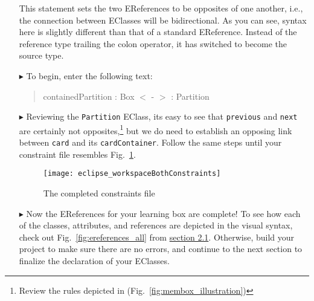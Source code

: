 \begin{itemize}
This statement sets the two EReferences to be opposites of one another, i.e., the connection between EClasses will be bidirectional. As you can see, syntax here
is slightly different than that of a standard EReference. Instead of the reference type trailing the colon operator, it has switched to become the source type.


\item[$\blacktriangleright$] To begin, enter the following text:

{\begin{quote} \small
	containedPartition : Box $<$ - $>$ : Partition
\end{quote}}

\item[$\blacktriangleright$] Reviewing the \texttt{Partition} EClass, its easy to see that \texttt{previous} and \texttt{next} are certainly not
opposites,\footnote{Review the rules depicted in (Fig.~\ref{fig:membox_illustration})} but we do need to establish an opposing link between
\texttt{card} and its \texttt{cardContainer}. Follow the same steps until your constraint file resembles Fig.~\ref{fig:bothConstraints}.

\begin{figure}[htbp]
	\centering
  \texttt{[image: eclipse\_workspaceBothConstraints]}
	\caption{The completed constraints file}
	\label{fig:bothConstraints}
\end{figure} 

\item[$\blacktriangleright$] Now the EReferences for your learning box are complete! To see how each of the classes, attributes, and references
are depicted in the visual syntax, check out Fig.~\ref{fig:ereferences_all} from \hyperlink{sec:static vis}{section 2.1}. Otherwise, build your project to
make sure there are no errors, and continue to the next section to finalize the declaration of your EClasses.


\end{itemize}
